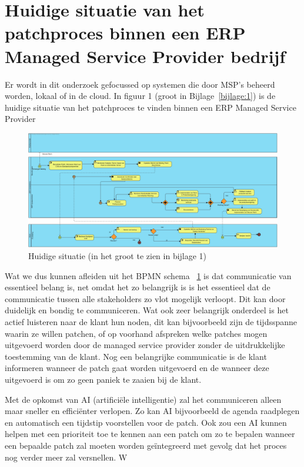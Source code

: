 \section{Huidige situatie van het patchproces binnen een ERP Managed Service Provider bedrijf}

Er wordt in dit onderzoek gefocussed op systemen die door MSP's beheerd worden, lokaal of in de cloud. In figuur 1 (groot in Bijlage~\ref{bijlage:1}) is de 
huidige situatie van het patchproces te vinden binnen een ERP Managed Service Provider \\

\begin{figure}[h]
    \centering
    \includegraphics[width=\textwidth]{huidigesituatie.jpg}
    \caption{Huidige situatie (in het groot te zien in bijlage 1)}
    \label{fig:huidigesituatie}
\end{figure}
\newpage

Wat we dus kunnen afleiden uit het BPMN schema ~\ref{fig:huidigesituatie} is dat communicatie van essentieel belang is, net omdat het zo belangrijk is is het essentieel dat de communicatie tussen alle stakeholders zo vlot mogelijk verloopt. Dit kan door duidelijk en bondig te communiceren. Wat 
ook zeer belangrijk onderdeel is het actief luisteren naar de klant hun noden, dit kan bijvoorbeeld zijn de tijdsspanne waarin ze willen patchen, of op voorhand afspreken
 welke patches mogen uitgevoerd worden door de managed service provider zonder de uitdrukkelijke toestemming van de klant. Nog een belangrijke communicatie is de klant informeren wanneer de patch gaat worden uitgevoerd en de wanneer deze uitgevoerd is om zo geen paniek te zaaien bij de klant. 

 Met de opkomst van AI (artificiële intelligentie) zal het communiceren alleen maar sneller en efficiënter verlopen. Zo kan AI bijvoorbeeld de agenda raadplegen en automatisch een tijdstip voorstellen voor de patch. Ook zou een AI kunnen helpen met een 
prioriteit toe te kennen aan een patch om zo te bepalen wanneer een bepaalde patch zal moeten worden geïntegreerd met gevolg dat het proces nog verder meer zal versnellen. W \\

